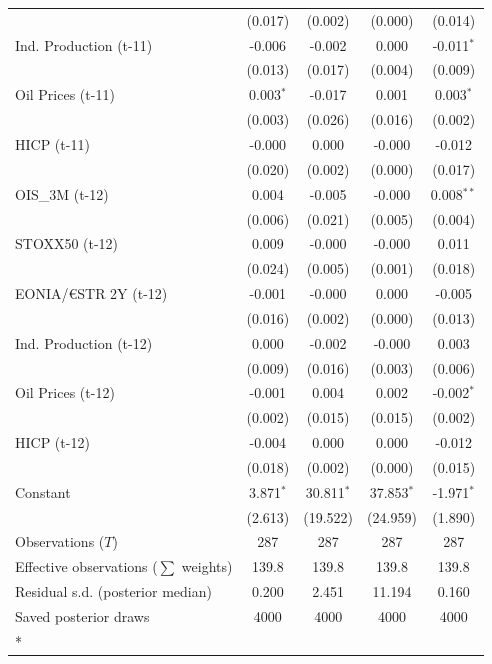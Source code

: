 \begin{longtable}[t]{lcccc}
 & (0.017) & (0.002) & (0.000) & (0.014)\\
Ind. Production (t-11) & -0.006 & -0.002 & 0.000 & -0.011$^{*}$\\
 & (0.013) & (0.017) & (0.004) & (0.009)\\
Oil Prices (t-11) & 0.003$^{*}$ & -0.017 & 0.001 & 0.003$^{*}$\\
 & (0.003) & (0.026) & (0.016) & (0.002)\\
HICP (t-11) & -0.000 & 0.000 & -0.000 & -0.012\\
 & (0.020) & (0.002) & (0.000) & (0.017)\\
OIS\_3M (t-12) & 0.004 & -0.005 & -0.000 & 0.008$^{**}$\\
 & (0.006) & (0.021) & (0.005) & (0.004)\\
STOXX50 (t-12) & 0.009 & -0.000 & -0.000 & 0.011\\
 & (0.024) & (0.005) & (0.001) & (0.018)\\
EONIA/€STR 2Y (t-12) & -0.001 & -0.000 & 0.000 & -0.005\\
 & (0.016) & (0.002) & (0.000) & (0.013)\\
Ind. Production (t-12) & 0.000 & -0.002 & -0.000 & 0.003\\
 & (0.009) & (0.016) & (0.003) & (0.006)\\
Oil Prices (t-12) & -0.001 & 0.004 & 0.002 & -0.002$^{*}$\\
 & (0.002) & (0.015) & (0.015) & (0.002)\\
HICP (t-12) & -0.004 & 0.000 & 0.000 & -0.012\\
 & (0.018) & (0.002) & (0.000) & (0.015)\\
Constant & 3.871$^{*}$ & 30.811$^{*}$ & 37.853$^{*}$ & -1.971$^{*}$\\
 & (2.613) & (19.522) & (24.959) & (1.890)\\
\midrule
Observations ($T$) & 287 & 287 & 287 & 287\\
Effective observations ($\sum$ weights) & 139.8 & 139.8 & 139.8 & 139.8\\
Residual s.d. (posterior median) & 0.200 & 2.451 & 11.194 & 0.160\\
Saved posterior draws & 4000 & 4000 & 4000 & 4000\\*
\end{longtable}
\endgroup{}

\begingroup\fontsize{7}{9}\selectfont

